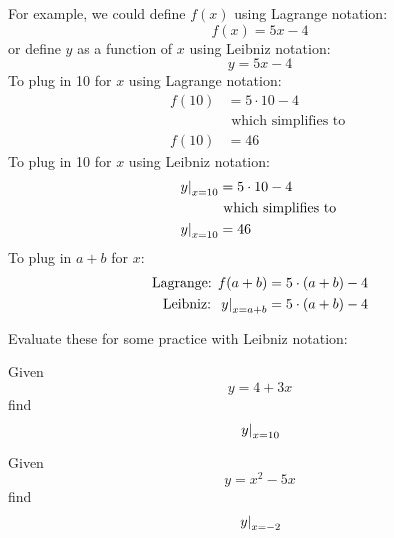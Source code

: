 For example, we could define $f(x)$ using Lagrange notation:
\begin{equation*}
 f(x) = 5 x - 4
\end{equation*}
or define $y$ as a function of $x$ using Leibniz notation:
\begin{equation*}
 y = 5 x - 4
\end{equation*}
To plug in 10 for $x$ using Lagrange notation:
\begin{equation*}
 \begin{split}
   f(10) &= 5 \cdot 10 - 4
   \\
   & \text{ which simplifies to }
   \\
   f(10) &= 46
 \end{split}
\end{equation*}
To plug in 10 for $x$ using Leibniz notation:
\begin{equation*}
 \begin{split}
   \left.y\right|_{x=10} &= 5 \cdot 10 - 4
   \\
   & \text{ which simplifies to }
   \\
   \left.y\right|_{x=10} &= 46
 \end{split}
\end{equation*}
To plug in $a + b$ for $x$:
\begin{equation*}
 \begin{split}
   \text{Lagrange: } f(a + b) &= 5 \cdot (a + b) - 4
   \\
   \text{Leibniz: } \left.y\right|_{x=a+b} &= 5 \cdot (a + b) - 4
 \end{split}
\end{equation*}

Evaluate these for some practice with Leibniz notation:

\begin{multicols}{2}
 \begin{ProblemSet}[pencil space=1in]
  \begin{Problem}
   Given
   \begin{equation*}
    y = 4 + 3 x
   \end{equation*}
   find
   \begin{equation*}
    \left.y\right|_{x = 10}
   \end{equation*}
  \end{Problem}
  \begin{Problem}
   Given
   \begin{equation*}
    y = x^2 - 5 x
   \end{equation*}
   find
   \begin{equation*}
    \left.y\right|_{x = -2}
   \end{equation*}
  \end{Problem}
 \end{ProblemSet}
\end{multicols}


